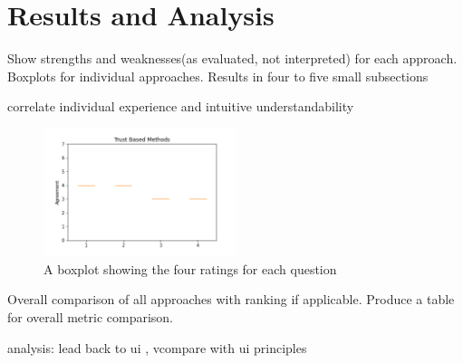 \section{Results and Analysis}

Show strengths and weaknesses(as evaluated, not interpreted) for each approach. Boxplots for individual approaches. Results in four to five small subsections

correlate individual experience and intuitive understandability

\begin{figure}
    \centering
    \includegraphics[width=0.5\textwidth]{main/Graphics/4ResultsandAnalysis/BoxPlot.png}
    \caption{A boxplot showing the four ratings for each question}
    \label{fig:Boxplot_Test}
\end{figure}

Overall comparison of all approaches with ranking if applicable. Produce a table for overall metric comparison. 

analysis: lead back to ui , vcompare with ui principles